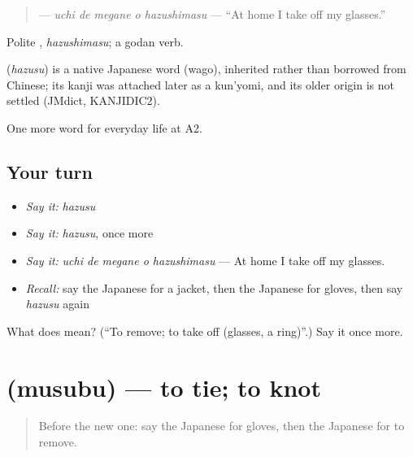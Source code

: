 \begin{quote}
\textbf{  } — \emph{uchi de megane o hazushimasu} — \textquotedblleft{}At home I take off my glasses.\textquotedblright{}
\end{quote}

Polite \textbf{}, \emph{hazushimasu}; a godan verb.

\begin{cousinweb}
\textbf{} (\emph{hazusu}) is a native Japanese word (wago), inherited rather than borrowed from Chinese; its kanji was attached later as a kun'yomi, and its older origin is not settled (JMdict, KANJIDIC2).
\end{cousinweb}

\begin{grammarlens}[title={What you've built}]
One more word for everyday life at A2.
\end{grammarlens}

\subsection*{Your turn}
\begin{itemize}
\raggedright
  \item \emph{Say it:} \emph{hazusu}
  \item \emph{Say it:} \emph{hazusu}, once more
  \item \emph{Say it:} \emph{uchi de megane o hazushimasu} — At home I take off my glasses.
  \item \emph{Recall:} say the Japanese for a jacket, then the Japanese for gloves, then say \emph{hazusu} again
\end{itemize}

\begin{tcolorbox}[breakable,colback=teal!4,colframe=teal!35!black,title={Before you move on}]
What does  mean? (\textquotedblleft{}To remove; to take off (glasses, a ring)\textquotedblright{}.) Say it once more.
\end{tcolorbox}
\section[\texorpdfstring{\ja{むすぶ} (musubu)}{むすぶ (musubu)}]{ (musubu) — to tie; to knot}

\label{lesson:JA-C150-musubu}



\begin{quote}
Before the new one: say the Japanese for gloves, then the Japanese for to remove.
\end{quote}

